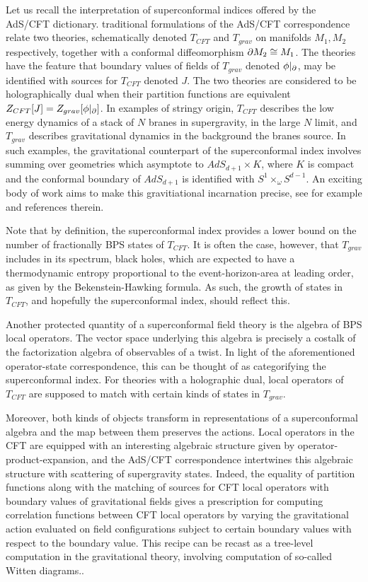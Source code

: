 \parsec[]
Let us recall the interpretation of superconformal indices offered by the AdS/CFT dictionary. traditional formulations of the AdS/CFT correspondence relate two theories, schematically denoted $T_{CFT}$ and $T_{grav}$ on manifolds $M_{1}, M_{2}$ respectively, together with a conformal diffeomorphism $\partial M_{2}\cong M_{1}$. The theories have the feature that boundary values of fields of $T_{grav}$ denoted $\phi |_{\partial}$, may be identified with sources for $T_{CFT}$ denoted $J$. The two theories are considered to be holographically dual when their partition functions are equivalent $Z_{CFT}[J] = Z_{grav}[\phi |_{\partial}]$. In examples of stringy origin, $T_{CFT}$ describes the low energy dynamics of a stack of $N$ branes in supergravity, in the large $N$ limit, and $T_{grav}$ describes gravitational dynamics in the background the branes source. In such examples, the gravitational counterpart of the superconformal index involves summing over geometries which asymptote to $AdS_{d+1} \times K$, where $K$ is compact and the conformal boundary of $AdS_{d+1}$ is identified with $S^1\times_\omega S^{d-1}$. An exciting body of work aims to make this gravitiational incarnation precise, see for example \cite{murthy2020growth} and references therein.  

Note that by definition, the superconformal index provides a lower bound on the number of fractionally BPS states of $T_{CFT}$. It is often the case, however, that $T_{grav}$ includes in its spectrum, black holes, which are expected to have a thermodynamic entropy proportional to the event-horizon-area at leading order, as given by the Bekenstein-Hawking formula. As such, the growth of states in $T_{CFT}$, and hopefully the superconformal index, should reflect this. 

\parsec[]
Another protected quantity of a superconformal field theory is the algebra of BPS local operators. The vector space underlying this algebra is precisely a costalk of the factorization algebra of observables of a twist. In light of the aforementioned operator-state correspondence, this can be thought of as categorifying the superconformal index. For theories with a holographic dual, local operators of $T_{CFT}$ are supposed to match with certain kinds of states in $T_{grav}$. 

Moreover, both kinds of objects transform in representations of a superconformal algebra and the map between them preserves the actions. Local operators in the CFT are equipped with an interesting algebraic structure given by operator-product-expansion, and the AdS/CFT correspondence intertwines this algebraic structure with scattering of supergravity states. Indeed, the equality of partition functions along with the matching of sources for CFT local operators with boundary values of gravitational fields gives a prescription for computing correlation functions between CFT local operators by varying the gravitational action evaluated on field configurations subject to certain boundary values with respect to the boundary value. This recipe can be recast as a tree-level computation in the gravitational theory, involving computation of so-called Witten diagrams.\cite{WittenAdS}.

